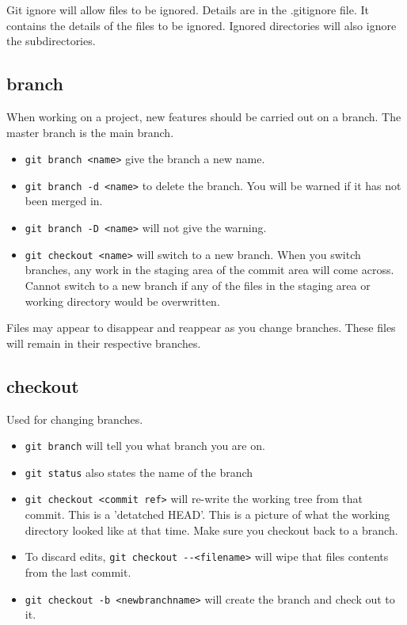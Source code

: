 \documentclass[11pt]{article} %
\begin{document}
Git ignore will allow files to be ignored.  Details are in the .gitignore file.  It contains the details of the files to be ignored. Ignored directories will also ignore the subdirectories. 

\subsection*{branch}
When working on a project, new features should be carried out on a branch. The master branch is the main branch.  
\begin{itemize}
\item \lstinline{git branch <name>} give the branch a new name. 
\item \lstinline{git branch -d <name>} to delete the branch.  You will be warned if it has not been merged in. 
\item \lstinline{git branch -D <name>} will not give the warning. 
\item \lstinline{git checkout <name>} will switch to a new branch. When you switch branches, any work in the staging area of the commit area will come across. Cannot switch to a new branch if any of the files in the staging area or working directory would be overwritten.  
\end{itemize}
Files may appear to disappear and reappear as you change branches.  These files will remain in their respective branches. 

\subsection{checkout}
Used for changing branches. 
\begin{itemize}
\item \lstinline{git branch} will tell you what branch you are on.
\item \lstinline{git status} also states the name of the branch
\item \lstinline{git checkout <commit ref>} will re-write the working tree from that commit. This is a 'detatched HEAD'. This is a picture of what the working directory looked like at that time. Make sure you checkout back to a branch. 
\item To discard edits, \lstinline{git checkout --<filename>} will wipe that files contents from the last commit. 
\item \lstinline{git checkout -b <newbranchname>} will create the branch and check out to it.
\end{itemize}
\end{document}

